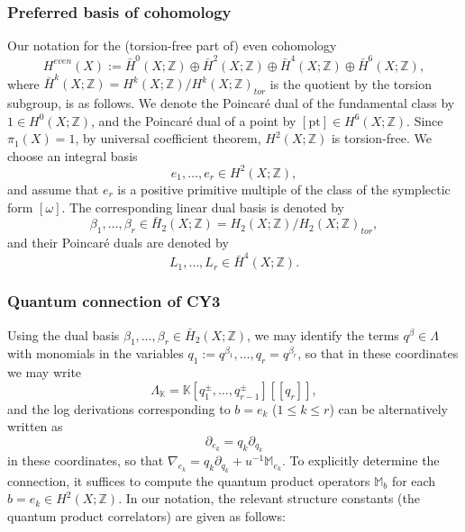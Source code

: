 \documentclass[reqno]{amsart}
\numberwithin{equation}{section}
\numberwithin{equation}{section}
\numberwithin{equation}{section}
\theoremstyle{definition}
\theoremstyle{remark}
\theoremstyle{remark}
\begin{document}
\subsubsection{Preferred basis of cohomology}
Our notation for the (torsion-free part of) even cohomology
\begin{equation}
    H^{even}(X) :=  \bar{H}^0(X;\mathbb{Z}) \oplus \bar{H}^2(X;\mathbb{Z}) \oplus \bar{H}^4(X;\mathbb{Z}) \oplus \bar{H}^6 (X;\mathbb{Z}),
\end{equation}
where $\bar{H}^k(X;\mathbb{Z}) = H^k(X;\mathbb{Z})/H^k(X;\mathbb{Z})_{tor}$ is the quotient by the torsion subgroup, is as follows. We denote the Poincar\'e dual of the fundamental class by $ 1 \in H^0(X;\mathbb{Z})$, and the Poincar\'e dual of a point by $[\mathrm{pt}] \in H^6(X;\mathbb{Z})$. Since $\pi_1(X) = 1$, by universal coefficient theorem, $H^2(X;\mathbb{Z})$ is torsion-free. We choose an integral basis 
\begin{equation}
    e_1, \dots, e_r \in H^2(X;\mathbb{Z}),
\end{equation} and assume that $e_r$ is a positive primitive multiple of the class of the symplectic form $[\omega]$. The corresponding linear dual basis is denoted by
\begin{equation}
    \beta_1, \dots, \beta_r \in \bar{H}_2(X;\mathbb{Z}) = H_2(X;\mathbb{Z})/H_2(X;\mathbb{Z})_{tor},
\end{equation}
and their Poincar\'e duals are denoted by
\begin{equation}
    L_1, \dots, L_r \in \bar{H}^4(X;\mathbb{Z}).
\end{equation}


\subsubsection{Quantum connection of CY3}
Using the dual basis $\beta_1, \dots, \beta_r \in \bar{H}_2(X;\mathbb{Z})$, we may identify the terms $q^\beta \in \Lambda$ with monomials in the variables $q_1 := q^{\beta_1}, \dots, q_r = q^{\beta_r}$, so that in these coordinates we may write
\begin{equation}
    \Lambda_{\mathbb{K}} = \mathbb{K} [q_1^\pm, \dots, q_{r-1}^\pm] [\![q_r]\!],
\end{equation}
and the log derivations corresponding to $b = e_k$ ($1 \le k \le r$) can be alternatively written as
\begin{equation}
    \partial_{e_k} = q_k \partial_{q_k}
\end{equation}
in these coordinates, so that $\nabla_{e_k} = q_k \partial_{q_k} + u^{-1} \mathbb{M}_{e_k}$. To explicitly determine the connection, it suffices to compute the quantum product operators $\mathbb{M}_b$ for each $b  = e_k \in H^2(X;\mathbb{Z})$. In our notation, the relevant structure constants (the quantum product correlators) are given as follows:
\end{document}
